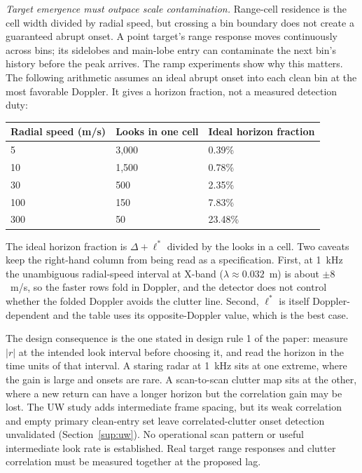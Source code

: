 \documentclass[10pt]{article}
\begin{document}
\emph{Target emergence must outpace scale contamination.} Range-cell residence is the cell width divided by radial speed, but crossing a bin boundary does not create a guaranteed abrupt onset. A point target's range response moves continuously across bins; its sidelobes and main-lobe entry can contaminate the next bin's history before the peak arrives. The ramp experiments show why this matters. The following arithmetic assumes an ideal abrupt onset into each clean bin at the most favorable Doppler. It gives a horizon fraction, not a measured detection duty:

\begin{center}\small
\begin{tabular}{lll}
\toprule
Radial speed (m/s) & Looks in one cell & Ideal horizon fraction\\
\midrule
5 & 3{,}000 & 0.39\%\\
10 & 1{,}500 & 0.78\%\\
30 & 500 & 2.35\%\\
100 & 150 & 7.83\%\\
300 & 50 & 23.48\%\\
\bottomrule
\end{tabular}
\end{center}

\noindent The ideal horizon fraction is $\Delta+\ell^{\ast}$ divided by the looks in a cell. Two
caveats keep the right-hand column from being read as a specification. First, at 1~kHz the
unambiguous radial-speed interval at X-band ($\lambda\approx0.032$~m) is about
$\pm8$~m/s, so the faster rows fold in Doppler, and the detector does not control
whether the folded Doppler avoids the clutter line. Second, $\ell^{\ast}$ is itself
Doppler-dependent and the table uses its opposite-Doppler value, which is the best case.

The design consequence is the one stated in design rule 1 of the paper: measure $|r|$ at the
intended look interval before choosing it, and read the horizon in the time units of that
interval. A staring radar at 1~kHz sits at one extreme, where the gain is large and onsets are
rare. A scan-to-scan clutter map sits at the other, where a new return can have a longer horizon but the
correlation gain may be lost. The UW study adds intermediate frame spacing, but its weak correlation and empty primary clean-entry set leave correlated-clutter onset detection unvalidated (Section~\ref{sup:uw}). No operational scan pattern or useful intermediate look rate is established. Real target range responses and
clutter correlation must be measured together at the proposed lag.
\end{document}
